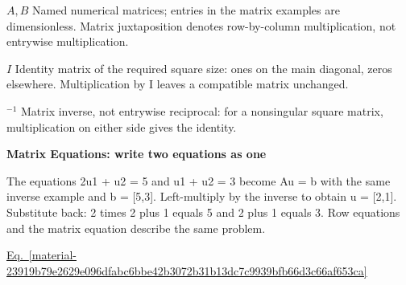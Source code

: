 \documentclass[11pt,a4paper]{article}
\begin{document}
\begin{minipage}{\linewidth}
\par\noindent\textbf{\(A,B\)} Named numerical matrices; entries in the matrix examples are dimensionless. Matrix juxtaposition denotes row-by-column multiplication, not entrywise multiplication.

\par\noindent\textbf{\(I\)} Identity matrix of the required square size: ones on the main diagonal, zeros elsewhere. Multiplication by I leaves a compatible matrix unchanged.

\par\noindent\textbf{\({}^{-1}\)} Matrix inverse, not entrywise reciprocal: for a nonsingular square matrix, multiplication on either side gives the identity.

\end{minipage}\par
\medskip

\textbf{Matrix Equations: write two equations as one}


The equations 2u1 + u2 = 5 and u1 + u2 = 3 become Au = b with the same inverse example and b = [5,3]. Left-multiply by the inverse to obtain u = [2,1]. Substitute back: 2 times 2 plus 1 equals 5 and 2 plus 1 equals 3. Row equations and the matrix equation describe the same problem.


\hyperref[material-23919b79e2629e096dfabc6bbe42b3072b31b13dc7c9939bfb66d3c66af653ca]{Eq.~\ref*{material-23919b79e2629e096dfabc6bbe42b3072b31b13dc7c9939bfb66d3c66af653ca}}
\end{document}
